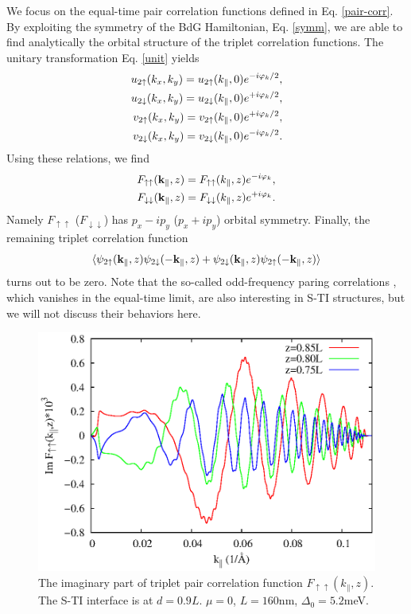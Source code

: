 We focus on the equal-time pair correlation functions defined in Eq. \eqref{pair-corr}.
By exploiting the symmetry of the BdG Hamiltonian, Eq. \eqref{symm}, we are able to
find analytically the orbital structure of the triplet correlation functions. The unitary 
transformation Eq. \eqref{unit} yields
\begin{align}
u_{2\uparrow}(k_x,k_y)=u_{2\uparrow}(k_\parallel,0)e^{-i\varphi_k/2},\nonumber \\
u_{2\downarrow}(k_x,k_y)=u_{2\downarrow}(k_\parallel,0)e^{+i\varphi_k/2},\nonumber \\
v_{2\uparrow}(k_x,k_y)=v_{2\uparrow}(k_\parallel,0)e^{+i\varphi_k/2},\nonumber \\
v_{2\downarrow}(k_x,k_y)=v_{2\downarrow}(k_\parallel,0)e^{-i\varphi_k/2}. 
\end{align}
Using these relations, we find
\begin{align}
F_{\uparrow\uparrow}(\mathbf{k}_\parallel,z)=F_{\uparrow\uparrow}(k_\parallel,z)e^{-i\varphi_k},\\
F_{\downarrow\downarrow}(\mathbf{k}_\parallel,z)=F_{\downarrow\downarrow}(k_\parallel,z)e^{+i\varphi_k}.
\end{align}
Namely $F_{\uparrow\uparrow}$ ($F_{\downarrow\downarrow}$) has $p_x-ip_y$ ($p_x+ip_y$) orbital 
symmetry. Finally, the remaining triplet correlation function
\begin{equation}
\langle \psi_{2\uparrow}(\mathbf{k}_\parallel,z) \psi_{2\downarrow} (-\mathbf{k}_\parallel,z)+ \psi_{2\downarrow}(\mathbf{k}_\parallel,z) \psi_{2\uparrow}(-\mathbf{k}_\parallel,z)\rangle
\end{equation}
turns out to be zero. Note that the so-called odd-frequency paring correlations 
\cite{esch,tanaka,trip}, which vanishes in the equal-time limit, 
are also interesting in S-TI structures, but 
we will not discuss their behaviors here.

\begin{figure}
\center
\includegraphics[width=\textwidth]{include/pwave.eps}
\caption{The imaginary part of triplet pair correlation function 
$F_{\uparrow\uparrow}(k_\parallel,z)$. The S-TI interface is at
$d=0.9L$. $\mu=0$, $L=160$nm, $\Delta_0=5.2$meV.
}\label{pw}
\end{figure}

